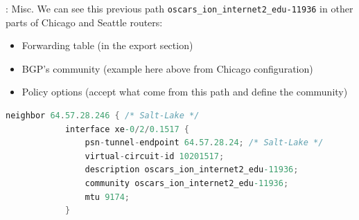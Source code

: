 \documentclass[usenames,dvipsnames]{beamer}
\begin{document}
\begin{frame}[fragile]{\insertsubsection: Misc.}
We can see this previous path \texttt{oscars\_ion\_internet2\_edu-11936} in other parts of Chicago and Seattle routers:
\begin{itemize}
	\item Forwarding table (in the export section)
    \item BGP's community (example here above from Chicago configuration)
    \item Policy options (accept what come from this path and define the community)
\end{itemize}

\begin{lstlisting}[language=C]
       neighbor 64.57.28.246 { /* Salt-Lake */
            interface xe-0/2/0.1517 {
                psn-tunnel-endpoint 64.57.28.24; /* Salt-Lake */
                virtual-circuit-id 10201517;
                description oscars_ion_internet2_edu-11936;
                community oscars_ion_internet2_edu-11936;
                mtu 9174;
            }
\end{lstlisting}

\end{frame}
\end{document}
